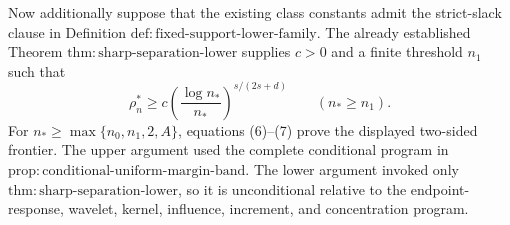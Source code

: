 Now additionally suppose that the existing class constants admit the strict-slack clause in Definition \(\mathrm{def:fixed\text{-}support\text{-}lower\text{-}family}\).  The already established Theorem \(\mathrm{thm:sharp\text{-}separation\text{-}lower}\) supplies \(c>0\) and a finite threshold \(n_1\) such that
\[
 \rho_n^\ast\ge c
 \left(\frac{\log n_\ast}{n_\ast}\right)^{s/(2s+d)}
 \qquad(n_\ast\ge n_1).
 \tag{7}
\]
For \(n_\ast\ge\max\{n_0,n_1,2,A\}\), equations (6)--(7) prove the displayed two-sided frontier.  The upper argument used the complete conditional program in \(\mathrm{prop:conditional\text{-}uniform\text{-}margin\text{-}band}\).  The lower argument invoked only \(\mathrm{thm:sharp\text{-}separation\text{-}lower}\), so it is unconditional relative to the endpoint-response, wavelet, kernel, influence, increment, and concentration program.
